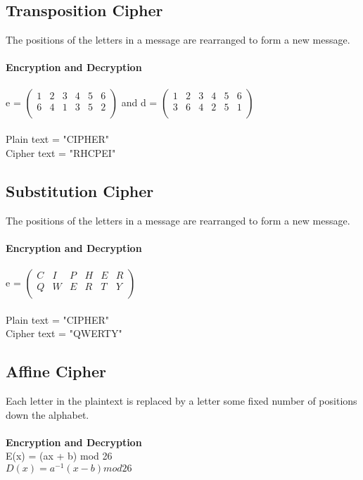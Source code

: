 \documentclass[11pt]{article}
\begin{document}
\subsection*{Transposition Cipher}
The positions of the letters in a message are rearranged to form a new message.\\ \\
\textbf{Encryption and Decryption} \\ \\
e = 
$ \begin{pmatrix}
1 & 2 & 3 & 4 & 5 & 6\\
6 & 4 & 1 & 3 & 5 & 2\\
\end{pmatrix} $
and d = 
$ \begin{pmatrix}
1 & 2 & 3 & 4 & 5 & 6\\
3 & 6 & 4 & 2 & 5 & 1\\
\end{pmatrix} $
\\ \\
Plain text = "CIPHER" \\
Cipher text = "RHCPEI" \\ 

\subsection*{Substitution Cipher}
The positions of the letters in a message are rearranged to form a new message.\\ \\
\textbf{Encryption and Decryption} \\ \\
e = 
$ \begin{pmatrix}
C & I & P & H & E & R \\ 
Q & W & E & R & T & Y \\
\end{pmatrix} $
\\ \\
Plain text = "CIPHER" \\
Cipher text = "QWERTY" \\ 

\subsection*{Affine Cipher}
Each letter in the plaintext is replaced by a letter some fixed number of positions down the alphabet.\\ \\
\textbf{Encryption and Decryption} \\ 
E(x) = (ax + b) mod 26 \\
$ D(x) = a^{-1}(x - b) mod 26 $ \\ 
\end{document}
